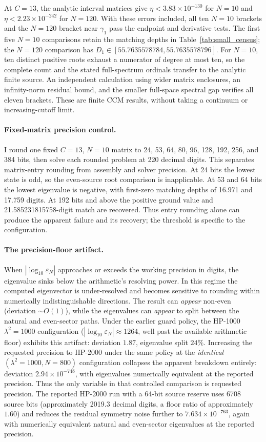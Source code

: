 \documentclass[11pt,a4paper]{article}
\begin{document}
At $C=13$, the analytic interval matrices give
$\eta<3.83\times10^{-130}$ for $N=10$ and
$\eta<2.23\times10^{-242}$ for $N=120$. With these errors included,
all ten $N=10$ brackets and the $N=120$ bracket near $\gamma_1$
pass the endpoint and derivative tests. The first five $N=10$
comparisons retain the matching depths in Table~\ref{tab:small_census};
the $N=120$ comparison has
$D_1\in[55.7635578784,55.7635578796]$.
For $N=10$, ten distinct positive roots exhaust a numerator of
degree at most ten, so the complete count and the stated full-spectrum
ordinals transfer to the analytic finite source. An independent
calculation using wider matrix enclosures, an infinity-norm residual
bound, and the smaller full-space spectral gap verifies all eleven
brackets. These are finite CCM results, without taking a continuum
or increasing-cutoff limit.

\paragraph{Fixed-matrix precision control.}
I round one fixed $C=13$, $N=10$ matrix to 24, 53, 64, 80, 96,
128, 192, 256, and 384 bits, then solve each rounded problem at
220 decimal digits. This separates matrix-entry rounding from
assembly and solver precision. At 24 bits the lowest state is odd,
so the even-source root comparison is inapplicable. At 53 and 64
bits the lowest eigenvalue is negative, with first-zero matching
depths of 16.971 and 17.759 digits. At 192 bits and above the
positive ground value and 21.585231815758-digit match are recovered.
Thus entry rounding alone can produce the apparent failure and its
recovery; the threshold is specific to the configuration.

\paragraph{The precision-floor artifact.}
When $|\log_{10}\varepsilon_N|$ approaches or exceeds the working
precision in digits, the eigenvalue sinks below the arithmetic's
resolving power. In this regime the computed eigenvector is
under-resolved and becomes sensitive to rounding within numerically
indistinguishable directions. The result can \emph{appear} non-even
(deviation $\sim O(1)$), while the eigenvalues can \emph{appear} to
split between the natural and even-sector paths. Under the earlier
guard policy, the HP-1000 $\lambda^2 = 1000$ configuration
($|\log_{10}\varepsilon_N| \approx 1264$, well past the available
arithmetic floor) exhibits this artifact: deviation $1.87$, eigenvalue
split $24\%$. Increasing the requested precision to HP-2000 under the
same policy at the \emph{identical} $(\lambda^2{=}1000, N{=}800)$
configuration collapses the apparent breakdown entirely: deviation
$2.94 \times 10^{-748}$, with eigenvalues numerically equivalent at the
reported precision. Thus the only
variable in that controlled comparison is requested precision. The
reported HP-2000 run with a 64-bit source reserve uses 6708 source bits (approximately
2019.3 decimal digits, a floor ratio of approximately $1.60$) and
reduces the residual symmetry noise further to
$7.634 \times 10^{-763}$, again with numerically equivalent natural and
even-sector eigenvalues at the reported precision.
\end{document}
